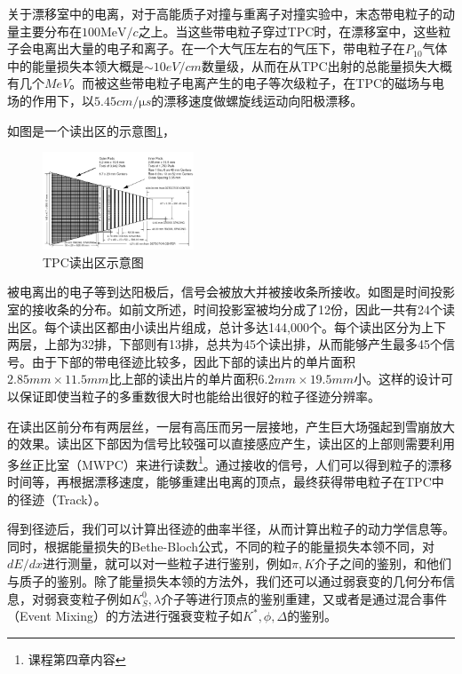 \documentclass[%
 reprint,
 amsmath,amssymb,
 aps,
]{revtex4-1}
\begin{document}
关于漂移室中的电离，对于高能质子对撞与重离子对撞实验中，末态带电粒子的动量主要分布在$100\si{\MeV/c}$之上。当这些带电粒子穿过TPC时，在漂移室中，这些粒子会电离出大量的电子和离子。在一个大气压左右的气压下，带电粒子在$P_{10}$气体中的能量损失本领大概是$\sim10\si{eV/cm}$数量级，从而在从TPC出射的总能量损失大概有几个$\si{MeV}$。而被这些带电粒子电离产生的电子等次级粒子，在TPC的磁场与电场的作用下，以$5.45\si{cm/\micro s}$的漂移速度做螺旋线运动向阳极漂移。

如图是一个读出区的示意图\ref{fig:TPCpad}，
\begin{figure}[htbp]
    \includegraphics[width = 0.4\textwidth]{Plots/TPCpad.png}
    \caption{\label{fig:TPCpad}TPC读出区示意图}
\end{figure}
被电离出的电子等到达阳极后，信号会被放大并被接收条所接收。如图是时间投影室的接收条的分布。如前文所述，时间投影室被均分成了12份，因此一共有24个读出区。每个读出区都由小读出片组成，总计多达144,000个。每个读出区分为上下两层，上部为32排，下部则有13排，总共为45个读出排，从而能够产生最多45个信号。由于下部的带电径迹比较多，因此下部的读出片的单片面积$2.85\si{mm}\times11.5\si{mm}$比上部的读出片的单片面积$6.2\si{mm}\times19.5\si{mm}$小。这样的设计可以保证即使当粒子的多重数很大时也能给出很好的粒子径迹分辨率。

在读出区前分布有两层丝，一层有高压而另一层接地，产生巨大场强起到雪崩放大的效果。读出区下部因为信号比较强可以直接感应产生，读出区的上部则需要利用多丝正比室（MWPC）来进行读数\footnote{课程第四章内容}。通过接收的信号，人们可以得到粒子的漂移时间等，再根据漂移速度，能够重建出电离的顶点，最终获得带电粒子在TPC中的径迹（Track）。

得到径迹后，我们可以计算出径迹的曲率半径，从而计算出粒子的动力学信息等。同时，根据能量损失的Bethe-Bloch公式，不同的粒子的能量损失本领不同，对$dE/dx$进行测量，就可以对一些粒子进行鉴别，例如$\pi,K$介子之间的鉴别，和他们与质子的鉴别。除了能量损失本领的方法外，我们还可以通过弱衰变的几何分布信息，对弱衰变粒子例如$K_S^0,\lambda$介子等进行顶点的鉴别重建，又或者是通过混合事件（Event Mixing）的方法进行强衰变粒子如$K^*,\phi,\Delta$的鉴别。
\end{document}
